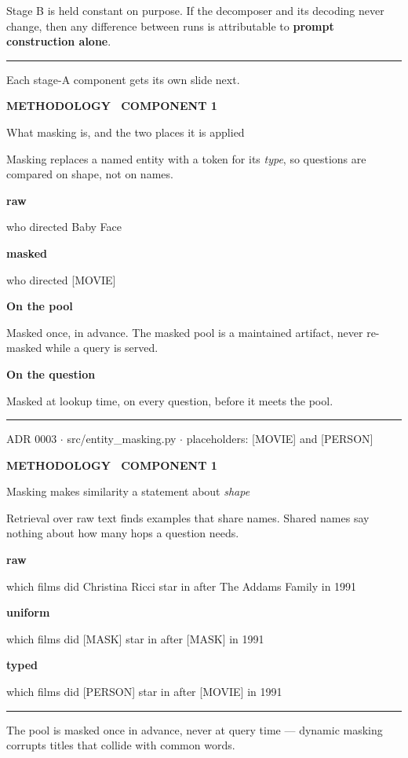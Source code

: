 \documentclass[aspectratio=169,11pt]{beamer}
\providecommand{\textls}[2][]{#2}
\newcommand{\lsp}[1]{\textls[140]{#1}}
\newcommand{\slidehead}[2]{%
  {\color{accent}\fontsize{6.8}{8}\selectfont\bfseries\lsp{#1}\par}%
  \vspace{2.4mm}%
  {\color{ink}\fontsize{15}{18}\selectfont #2\par}%
  \vspace{3.4mm}%
}
\newcommand{\thinrule}[1]{\noindent\textcolor{#1}{\rule{\linewidth}{0.4pt}}\par}
\newcommand{\srcline}[1]{%
  \vfill\thinrule{rulec}\vspace{1.5mm}%
  {\color{muted}\fontsize{6.6}{8}\selectfont #1\par}}
\newcommand{\srcmono}[1]{%
  \vfill\thinrule{rulec}\vspace{1.5mm}%
  {\color{muted}\ttfamily\fontsize{6.6}{8}\selectfont #1\par}}
\newcommand{\calloutbg}[3]{%
  \par\vspace{2.6mm}%
  \begin{lrbox}{\cobox}%
    \begin{minipage}{\dimexpr\linewidth-9mm\relax}%
      \color{inktwo}\footnotesize #3%
    \end{minipage}%
  \end{lrbox}%
  \noindent{\setlength{\fboxsep}{0pt}%
    \colorbox{#1}{\raisebox{0pt}[\dimexpr\ht\cobox+2.2mm\relax][\dimexpr\dp\cobox+2.2mm\relax]{\rule{1.6pt}{0pt}}}%
    \colorbox{#2}{\raisebox{0pt}[\dimexpr\ht\cobox+2.2mm\relax][\dimexpr\dp\cobox+2.2mm\relax]{\hspace{3mm}\usebox{\cobox}\hspace{3mm}}}}%
  \par\vspace{2.6mm}%
}
\newcommand{\callout}[1]{\calloutbg{accent}{sunk}{#1}}
\newcommand{\txtbox}[3]{%
  {\setlength{\fboxsep}{1.8mm}\colorbox{#1}{\begin{minipage}[t]{#2}#3\end{minipage}}}}
\newcommand{\defrow}[3][30mm]{%
  \par\noindent\footnotesize
  \parbox[t]{#1}{\raggedright\bfseries\textcolor{ink}{#2}}%
  \parbox[t]{\dimexpr\linewidth-#1\relax}{\raggedright\textcolor{inktwo}{#3}}%
  \par\vspace{2.6mm}}
\newcommand{\ladderrow}[5][28mm]{%
  \par\noindent\footnotesize
  \parbox[t]{#1}{\raggedleft\bfseries\textcolor{ink}{#2}\par
   \vspace{0.3mm}{\scriptsize\textcolor{muted}{#3}\par}}%
  \hspace{3mm}%
  \txtbox{#4}{\dimexpr\linewidth-#1-7mm\relax}{\ttfamily#5}%
  \par\vspace{1.8mm}}
\newcommand{\exrow}[4][20mm]{%
  \par\noindent\footnotesize
  \parbox[t]{#1}{\raggedright\bfseries\textcolor{ink}{#2}}%
  \txtbox{#3}{\dimexpr\linewidth-#1-4mm\relax}{\ttfamily#4}%
  \par\vspace{2.2mm}}
\newcommand{\plc}[1]{{\ttfamily\color{gold}#1}}
\begin{document}
\begin{frame}[t]
\begin{center}
\end{center}
\callout{Stage B is held constant on purpose. If the decomposer and its decoding never change,
 then any difference between runs is attributable to \textbf{prompt construction alone}.}
\srcline{Each stage-A component gets its own slide next.}
\end{frame}

\begin{frame}[t]
\slidehead{METHODOLOGY \textperiodcentered\ COMPONENT 1}{What masking is, and the two places it is applied}
{\color{inktwo}\small
 Masking replaces a named entity with a token for its \emph{type}, so questions are compared
 on shape, not on names.\par}
\vspace{3mm}
\exrow{raw}{sunk}{\textcolor{inktwo}{who directed Baby Face}}
\exrow{masked}{accentsoft}{\textcolor{accentink}{who directed }\plc{[MOVIE]}}
\vspace{3mm}
\defrow[32mm]{On the pool}{Masked once, in advance. The masked pool is a maintained artifact,
 never re-masked while a query is served.}
\defrow[32mm]{On the question}{Masked at lookup time, on every question, before it meets the pool.}
\srcmono{ADR 0003 $\cdot$ src/entity\_masking.py $\cdot$ placeholders: [MOVIE] and [PERSON]}
\end{frame}

\begin{frame}[t]
\slidehead{METHODOLOGY \textperiodcentered\ COMPONENT 1}{Masking makes similarity a statement about \emph{shape}}
{\color{inktwo}\small
 Retrieval over raw text finds examples that share names. Shared names say nothing about
 how many hops a question needs.\par}
\vspace{4mm}
\ladderrow[24mm]{raw}{entities intact}{sunk}%
 {\textcolor{inktwo}{which films did Christina Ricci star in after The Addams Family in 1991}}
\ladderrow[24mm]{uniform}{one shared token}{sunk}%
 {\textcolor{inktwo}{which films did \textcolor{accent}{[MASK]} star in after \textcolor{accent}{[MASK]} in 1991}}
\ladderrow[24mm]{typed}{type label kept}{accentsoft}%
 {\textcolor{accentink}{which films did \plc{[PERSON]} star in after \plc{[MOVIE]} in 1991}}
\srcline{The pool is masked once in advance, never at query time --- dynamic masking corrupts
 titles that collide with common words.}
\end{frame}
\end{document}

